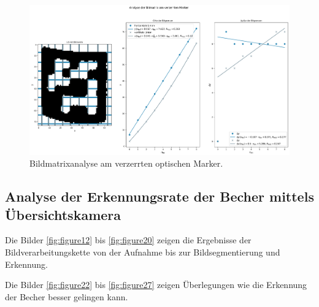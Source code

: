     
    \begin{figure}
        \caption[Bildmatrixanalyse]{\small Bildmatrixanalyse am verzerrten optischen Marker.}\label{fig:figure21}
        \includegraphics[width = \textwidth]{Bilder/cup6_analyse.png}
        \centering
    \end{figure}

    \clearpage
    
    \clearpage

    \subsection{Analyse der Erkennungsrate der Becher mittels Übersichtskamera}

    Die Bilder \ref{fig:figure12} bis \ref{fig:figure20} zeigen die Ergebnisse der Bildverarbeitungskette von der Aufnahme bis zur Bildsegmentierung und Erkennung.

    Die Bilder \ref{fig:figure22} bis \ref{fig:figure27} zeigen Überlegungen wie die Erkennung der Becher besser gelingen kann. 


